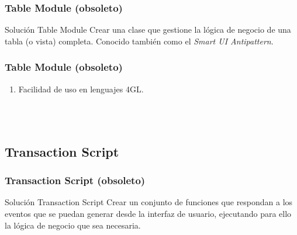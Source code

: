 \documentclass[handout,a4paper,slidestop,xcolor=pst,blue]{beamer}
\begin{document}
\begin{frame}[c]
    \frametitle{Table Module (obsoleto)}
    \begin{block}{Solución Table Module}
        Crear una clase que gestione la lógica de negocio de una tabla (o vista) completa. Conocido también como el \emph{Smart UI Antipattern}.
    \end{block}
\end{frame}

\begin{frame}[c]
    \frametitle{Table Module (obsoleto)}
    \begin{enumerate}
        \item<2-> Facilidad de uso en lenguajes 4GL.
    \end{enumerate}
    \ \\ \ \\
\end{frame}

\subsection{Transaction Script}

\begin{frame}[c]
    \frametitle{Transaction Script (obsoleto)}
    \begin{block}{Solución Transaction Script}
        Crear un conjunto de funciones que respondan a los eventos que se puedan generar desde la interfaz de usuario, ejecutando para ello la lógica de negocio que sea necesaria.
    \end{block}
\end{frame}
\end{document}
